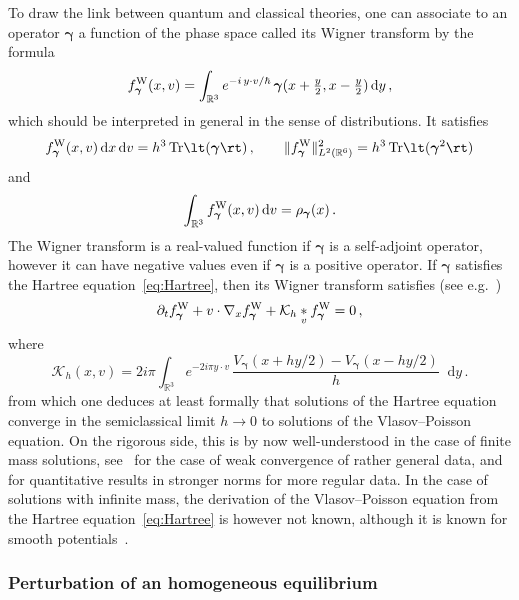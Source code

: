 \documentclass[a4paper,12pt]{amsart} %
\theoremstyle{plain}
\theoremstyle{definition}
\newcommand		{\RR}		{\mathbb R}			%
\newcommand		{\R}		{\RR}
\newcommand		{\Rd}		{\R^3}
\newcommand		{\Rdd}		{\R^6}
\newcommand		{\hd}		{h^3}
\newcommand		{\cK}		{\mathcal K}		%
\renewcommand	{\(}			{\lt(}
\renewcommand	{\)}			{\rt)}
\newcommand		{\snrm}[1]		{\lVert #1\rVert}
\newcommand		{\sNrm}[2]		{\snrm{#1}_{#2}}
\renewcommand		{\d}		{\mathop{}\!\mathrm{d}}		%
\newcommand			{\dpt}		{\partial_t}
\newcommand			{\Dx}		{\nabla_x}
\DeclareMathOperator{\tr}		{Tr}				%
\newcommand		{\Tr}[1]		{\tr\!\( #1 \)}		%
\newcommand		{\intd}			{\int_{\Rd}}
\newcommand	{\h}			{h}
\newcommand		{\opgam}		{{\boldsymbol{\gamma}}}
\newcommand		{\op}			{\opgam}	%
\newcommand	 {\Wigner}[1]		{f^\textnormal{W}_{#1}}
\begin{document}
	To draw the link between quantum and classical theories, one can associate to an operator $\op$ a function of the phase space called its Wigner transform by the formula
	\begin{equation*} %
		\Wigner{\op}(x,v) = \intd e^{-i\,y\cdot v/\hbar} \,\op(x+\tfrac{y}{2},x-\tfrac{y}{2})\d y \, ,
	\end{equation*}
	which should be interpreted in general in the sense of distributions. It satisfies
	\begin{equation*}
		\Wigner{\op}(x,v) \d x\d v = \hd \Tr{\op}\,, \qquad \sNrm{\Wigner{\op}}{L^2(\Rdd)}^2 = \hd \Tr{\op^2}
	\end{equation*}
	and 
	\begin{equation*}
		\intd \Wigner{\op}(x,v) \d v = \rho_{\op}(x) \, .
	\end{equation*}
	The Wigner transform is a real-valued function if $\op$ is a self-adjoint operator, however it can have negative values even if $\op$ is a positive operator. If $\op$ satisfies the Hartree equation~\eqref{eq:Hartree}, then its Wigner transform satisfies (see e.g.~\cite{lions_sur_1993})
	\begin{equation*} %
		\dpt \Wigner{\op} + v\cdot\Dx \Wigner{\op} + \cK_\h \underset{v}{*} \Wigner{\op} = 0 \, ,
	\end{equation*}
	where
	\begin{equation}\label{eq:Wigner_Vlasov_Kh}
		\cK_\h(x,v) = 2i\pi \intd e^{-2i\pi y\cdot v}\, \frac{V_{\op}(x+hy/2)-V_{\op}(x-hy/2)}{h} \d y \, .
	\end{equation}
	from which one deduces at least formally that solutions of the Hartree equation converge in the semiclassical limit $\h\to 0$ to solutions of the Vlasov--Poisson equation. On the rigorous side, this is by now well-understood in the case of finite mass solutions, see~\cite{lions_sur_1993, gerard_homogenization_1997, ambrosio_semiclassical_2011} for the case of weak convergence of rather general data, and \cite{lafleche_propagation_2019, lafleche_strong_2023, chong_l2_2023, iacobelli_enhanced_2024} for quantitative results in stronger norms for more regular data. In the case of solutions with infinite mass, the derivation of the Vlasov--Poisson equation from the Hartree equation~\eqref{eq:Hartree} is however not known, although it is known for smooth potentials~\cite{lewin_hartree_2020}.

\subsubsection{Perturbation of an homogeneous equilibrium}
\end{document}
